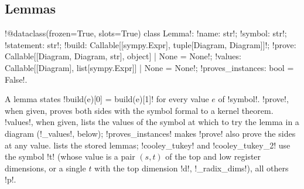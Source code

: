 \subsection{Lemmas}

\begin{signature}
\py!@dataclass(frozen=True, slots=True) class Lemma!: \py!name: str!; \py!symbol: str!; \py!statement: str!; \py!build: Callable[[sympy.Expr], tuple[Diagram, Diagram]]!; \py!prove: Callable[[Diagram, Diagram, str], object] | None = None!; \py!values: Callable[[Diagram], list[sympy.Expr]] | None = None!; \py!proves_instances: bool = False!.
\end{signature}

A lemma states \py!build(e)[0] = build(e)[1]! for every value $e$ of \py!symbol!. \py!prove!, when given, proves both sides with the symbol formal to a kernel theorem. \py!values!, when given, lists the values of the symbol at which to try the lemma in a diagram (\py!_values!, below); \py!proves_instances! makes \py!prove! also prove the sides at any value.  lists the stored lemmas; \code!cooley_tukey! and \code!cooley_tukey_2! use the symbol \code!t! (whose value is a pair $(s,t)$ of the top and low register dimensions, or a single $t$ with the top dimension \code!d!, \py!_radix_dims!), all others \code!p!.

